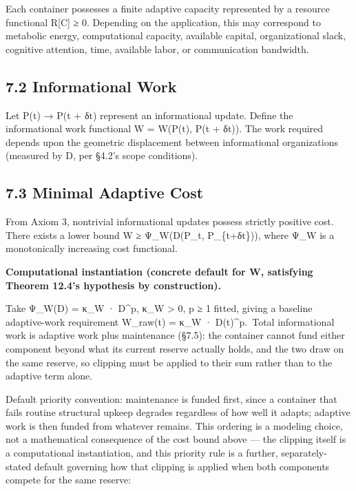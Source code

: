 \documentclass[
]{article}
\begin{document}
Each container possesses a finite adaptive capacity represented by a
resource functional R{[}C{]} ≥ 0. Depending on the application, this may
correspond to metabolic energy, computational capacity, available
capital, organizational slack, cognitive attention, time, available
labor, or communication bandwidth.

\hypertarget{informational-work}{%
\subsection{7.2 Informational Work}\label{informational-work}}

Let P(t) → P(t + δt) represent an informational update. Define the
informational work functional W = W(P(t), P(t + δt)). The work required
depends upon the geometric displacement between informational
organizations (measured by D, per §4.2's scope conditions).

\hypertarget{minimal-adaptive-cost}{%
\subsection{7.3 Minimal Adaptive Cost}\label{minimal-adaptive-cost}}

From Axiom 3, nontrivial informational updates possess strictly positive
cost. There exists a lower bound W ≥ Ψ\_W(D(P\_t, P\_\{t+δt\})), where
Ψ\_W is a monotonically increasing cost functional.

\textbf{Computational instantiation (concrete default for W, satisfying
Theorem 12.4's hypothesis by construction).}

Take Ψ\_W(D) = κ\_W · D\^{}p, κ\_W \textgreater{} 0, p ≥ 1 fitted,
giving a baseline adaptive-work requirement W\_raw(t) = κ\_W ·
D(t)\^{}p.~Total informational work is adaptive work plus maintenance
(§7.5): the container cannot fund either component beyond what its
current reserve actually holds, and the two draw on the same reserve, so
clipping must be applied to their sum rather than to the adaptive term
alone.

Default priority convention: maintenance is funded first, since a
container that fails routine structural upkeep degrades regardless of
how well it adapts; adaptive work is then funded from whatever remains.
This ordering is a modeling choice, not a mathematical consequence of
the cost bound above --- the clipping itself is a computational
instantiation, and this priority rule is a further, separately-stated
default governing how that clipping is applied when both components
compete for the same reserve:
\end{document}

